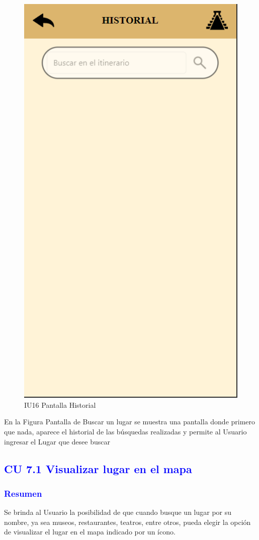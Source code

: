     \begin{figure}[h]
        
            \centering
            \includegraphics[width=.4\linewidth]{entregable final/pantallasSistema/IU16 Pantalla Historial.png}
    \caption{IU16 Pantalla Historial}
    
    \end{figure}

En la Figura Pantalla de Buscar un lugar se muestra una pantalla donde primero que nada, aparece el historial de las búsquedas realizadas y permite al Usuario ingresar el Lugar que desee buscar



\newpage
\subsection{\textcolor{blue}{CU 7.1 Visualizar lugar en el mapa}}

\subsubsection{\textcolor{blue}{Resumen}}
Se brinda al Usuario la posibilidad de que cuando busque un lugar por su nombre, ya sea museos, restaurantes, teatros, entre otros, pueda elegir la opción de visualizar el lugar en el mapa indicado por un ícono.

